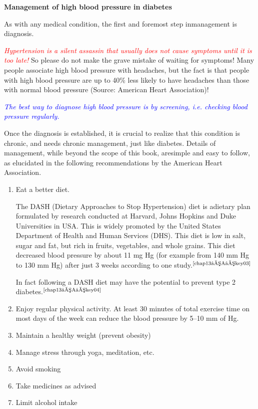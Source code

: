 \clearpage
\noindent\textbf{Management of high blood pressure in diabetes}

As with any medical condition, the first and foremost step in\break management is diagnosis.

\textcolor{red}{\textit{Hypertension is a silent assassin that usually does not cause symptoms until it is too late!}} So please do not make the grave mistake of wai\-ting for symptoms! Many people associate high blood pressure with headaches, but the fact is that people with high blood pressure are up to 40\% less likely to have headaches than those with normal blood pre\-ssure (Source: American Heart Association)!

\textcolor{blue}{\textit{The best way to diagnose high blood pressure is by screening, i.e. checking blood pressure regularly.}}

Once the diagnosis is established, it is crucial to realize that this condition is chronic, and needs chronic management, just like diabetes. Details of management, while beyond the scope of this book, are\break simple and easy to follow, as elucidated in the following recommenda\-tions by the American Heart Association.

\begin{enumerate}
\itemsep=0pt
\item Eat a better diet.
 
The DASH (Dietary Approaches to Stop Hypertension) diet is a\break dietary plan formulated by research conducted at Harvard, Johns Hopkins and Duke Universities in USA. This is widely promoted by the United States Department of Health and Human Services (DHS). This diet is low in salt, sugar and fat, but rich in fruits, vege\-tables, and whole grains. This diet decreased blood pressure by about 11 mg Hg (for example from 140 mm Hg to 130 mm Hg) after just 3 weeks according to one study.$^{\text{\cite{chap13–A–key03}}}$

 In fact following a DASH diet may have the potential to prevent type 2 diabetes.$^{\text{\cite{chap13–A–key04}}}$
\item Enjoy regular physical activity. At least 30 minutes of total exercise time on most days of the week can reduce the blood pressure by 5–10 mm of Hg.
\item Maintain a healthy weight (prevent obesity)
\item Manage stress through yoga, meditation, etc.
\item Avoid smoking
\item Take medicines as advised
\item Limit alcohol intake
\end{enumerate}

